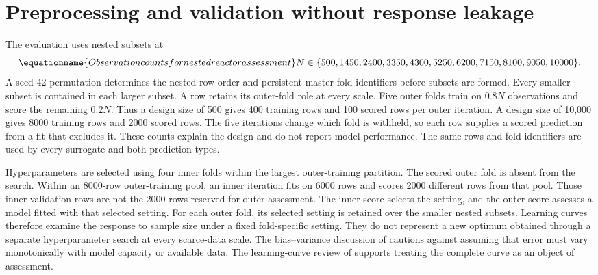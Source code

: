 \section{Preprocessing and validation without response leakage}

The evaluation uses nested subsets at
\begin{equation}
\equationname{Observation counts for nested reactor assessment}
N\in\{500,1450,2400,3350,4300,5250,6200,7150,8100,9050,10000\}.
\label{eq:reactor_nested_sample_sizes}
\end{equation}
A seed-42 permutation determines the nested row order and persistent master fold identifiers before subsets are formed. Every smaller subset is contained in each larger subset. A row retains its outer-fold role at every scale. Five outer folds train on $0.8N$ observations and score the remaining $0.2N$. Thus a design size of 500 gives 400 training rows and 100 scored rows per outer iteration. A design size of 10,000 gives 8000 training rows and 2000 scored rows. The five iterations change which fold is withheld, so each row supplies a scored prediction from a fit that excludes it. These counts explain the design and do not report model performance. The same rows and fold identifiers are used by every surrogate and both prediction types.

Hyperparameters are selected using four inner folds within the largest outer-training partition. The scored outer fold is absent from the search. Within an 8000-row outer-training pool, an inner iteration fits on 6000 rows and scores 2000 different rows from that pool. Those inner-validation rows are not the 2000 rows reserved for outer assessment. The inner score selects the setting, and the outer score assesses a model fitted with that selected setting. For each outer fold, its selected setting is retained over the smaller nested subsets. Learning curves therefore examine the response to sample size under a fixed fold-specific setting. They do not represent a new optimum obtained through a separate hyperparameter search at every scarce-data scale. The bias--variance discussion of \citet{Belkin2019} cautions against assuming that error must vary monotonically with model capacity or available data. The learning-curve review of \citet{VieringLoog2023} supports treating the complete curve as an object of assessment.

